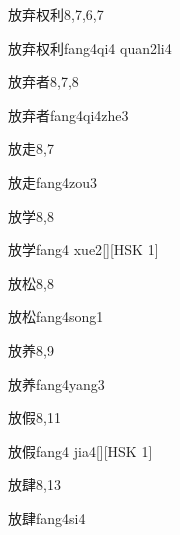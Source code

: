 \begin{entry}{放弃权利}{8,7,6,7}
  \begin{phonetics}{放弃权利}{fang4qi4 quan2li4}
  \end{phonetics}
\end{entry}

\begin{entry}{放弃者}{8,7,8}
  \begin{phonetics}{放弃者}{fang4qi4zhe3}
  \end{phonetics}
\end{entry}

\begin{entry}{放走}{8,7}
  \begin{phonetics}{放走}{fang4zou3}
  \end{phonetics}
\end{entry}

\begin{entry}{放学}{8,8}
  \begin{phonetics}{放学}{fang4 xue2}[][HSK 1]
  \end{phonetics}
\end{entry}

\begin{entry}{放松}{8,8}
  \begin{phonetics}{放松}{fang4song1}
  \end{phonetics}
\end{entry}

\begin{entry}{放养}{8,9}
  \begin{phonetics}{放养}{fang4yang3}
  \end{phonetics}
\end{entry}

\begin{entry}{放假}{8,11}
  \begin{phonetics}{放假}{fang4 jia4}[][HSK 1]
  \end{phonetics}
\end{entry}

\begin{entry}{放肆}{8,13}
  \begin{phonetics}{放肆}{fang4si4}
  \end{phonetics}
\end{entry}

